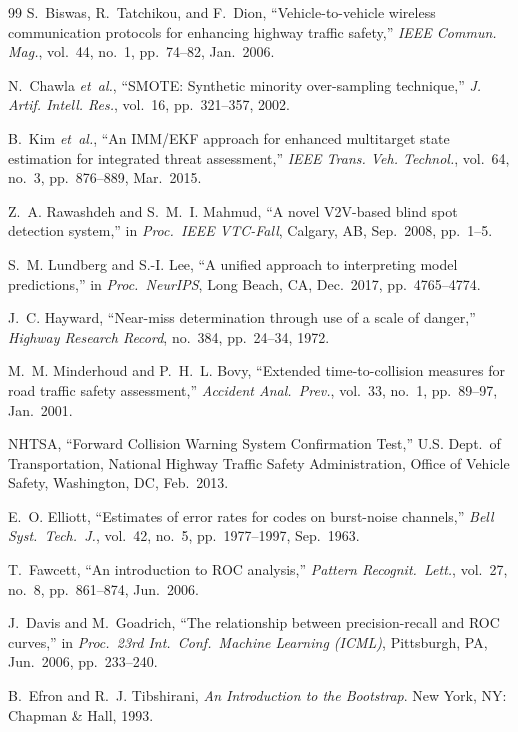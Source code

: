 \documentclass[sn-mathphys-num,Numbered,iicol]{sn-jnl}
\begin{document}
\begin{thebibliography}{99}
S.~Biswas, R.~Tatchikou, and F.~Dion, ``Vehicle-to-vehicle wireless
communication protocols for enhancing highway traffic safety,'' \textit{IEEE
Commun. Mag.}, vol.~44, no.~1, pp.~74--82, Jan.\ 2006.

N.~Chawla \textit{et~al.}, ``SMOTE: Synthetic minority over-sampling
technique,'' \textit{J. Artif. Intell. Res.}, vol.~16, pp.~321--357, 2002.

B.~Kim \textit{et~al.}, ``An IMM/EKF approach for enhanced multitarget
state estimation for integrated threat assessment,'' \textit{IEEE Trans.
Veh. Technol.}, vol.~64, no.~3, pp.~876--889, Mar.\ 2015.

Z.~A. Rawashdeh and S.~M.~I. Mahmud, ``A novel V2V-based blind spot
detection system,'' in \textit{Proc.\ IEEE VTC-Fall}, Calgary, AB, Sep.\ 2008,
pp.~1--5.

S.~M. Lundberg and S.-I. Lee, ``A unified approach to interpreting model
predictions,'' in \textit{Proc.\ NeurIPS}, Long Beach, CA, Dec.\ 2017,
pp.~4765--4774.

J.~C. Hayward, ``Near-miss determination through use of a scale of danger,''
\textit{Highway Research Record}, no.~384, pp.~24--34, 1972.

M.~M. Minderhoud and P.~H.~L. Bovy, ``Extended time-to-collision measures for
road traffic safety assessment,'' \textit{Accident Anal.\ Prev.}, vol.~33,
no.~1, pp.~89--97, Jan.\ 2001.

NHTSA, ``Forward Collision Warning System Confirmation Test,'' U.S. Dept.\ of
Transportation, National Highway Traffic Safety Administration, Office of
Vehicle Safety, Washington, DC, Feb.\ 2013.

E.~O. Elliott, ``Estimates of error rates for codes on burst-noise channels,''
\textit{Bell Syst.\ Tech.\ J.}, vol.~42, no.~5, pp.~1977--1997, Sep.\ 1963.

T.~Fawcett, ``An introduction to ROC analysis,'' \textit{Pattern Recognit.\
Lett.}, vol.~27, no.~8, pp.~861--874, Jun.\ 2006.

J.~Davis and M.~Goadrich, ``The relationship between precision-recall and ROC
curves,'' in \textit{Proc.\ 23rd Int.\ Conf.\ Machine Learning (ICML)},
Pittsburgh, PA, Jun.\ 2006, pp.~233--240.

B.~Efron and R.~J. Tibshirani, \textit{An Introduction to the Bootstrap}.
New York, NY: Chapman \& Hall, 1993.


\end{thebibliography}
\end{document}
